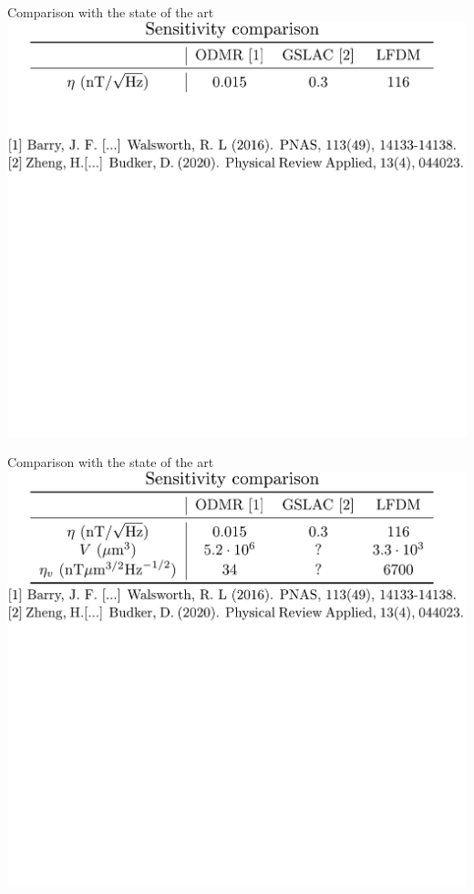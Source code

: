 \documentclass{beamer}
\begin{document}
\begin{frame}{Comparison with the state of the art}
\centering
\includegraphics[width=\textwidth,height=0.85\textheight,keepaspectratio]{Slide_comparison_litterature_f-6}
\end{frame}

\begin{frame}{Comparison with the state of the art}
\centering
\includegraphics[width=\textwidth,height=0.85\textheight,keepaspectratio]{Slide_comparison_litterature_f-5}
\end{frame}
\end{document}
